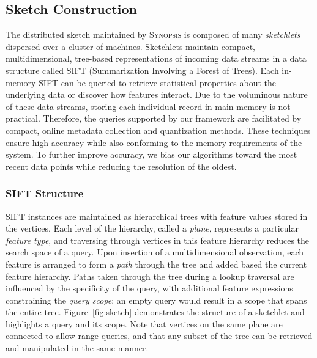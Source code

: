 \subsection{Sketch Construction}
\label{sec:sketch}
The distributed sketch maintained by \textsc{Synopsis} is composed of many \emph{sketchlets} dispersed over a cluster of machines. Sketchlets maintain compact, multidimensional, tree-based representations of incoming data streams in a data structure called SIFT (Summarization Involving a Forest of Trees). Each in-memory SIFT can be queried to retrieve statistical properties about the underlying data or discover how features interact. Due to the voluminous nature of these data streams, storing each individual record in main memory is not practical. Therefore, the queries supported by our framework are facilitated by compact, online metadata collection and quantization methods. These techniques ensure high accuracy while also conforming to the memory requirements of the system. To further improve accuracy, we bias our algorithms toward the most recent data points while reducing the resolution of the oldest.

\subsubsection{SIFT Structure}
SIFT instances are maintained as hierarchical trees with feature values stored in the vertices. Each level of the hierarchy, called a \emph{plane}, represents a particular \emph{feature type}, and traversing through vertices in this feature hierarchy reduces the search space of a query. Upon insertion of a multidimensional observation, each feature is arranged to form a \emph{path} through the tree and added based the current feature hierarchy. Paths taken through the tree during a lookup traversal are influenced by the specificity of the query, with additional feature expressions constraining the \emph{query scope}; an empty query would result in a scope that spans the entire tree. Figure~\ref{fig:sketch} demonstrates the structure of a sketchlet and highlights a query and its scope. Note that vertices on the same plane are connected to allow range queries, and that any subset of the tree can be retrieved and manipulated in the same manner.

